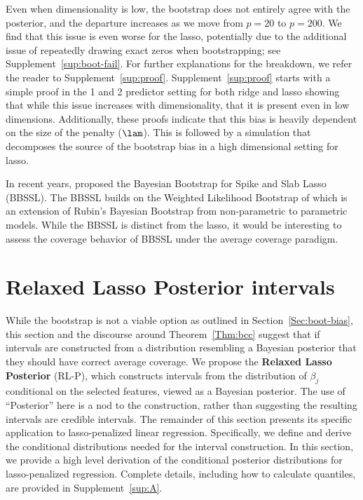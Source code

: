 Even when dimensionality is low, the bootstrap does not entirely agree with the posterior, and the departure increases as we move from $p=20$ to $p=200$. We find that this issue is even worse for the lasso, potentially due to the additional issue of repeatedly drawing exact zeros when bootstrapping; see Supplement~\ref{sup:boot-fail}. For further explanations for the breakdown, we refer the reader to Supplement~\ref{sup:proof}. Supplement~\ref{sup:proof} starts with a simple proof in the 1 and 2 predictor setting for both ridge and lasso showing that while this issue increases with dimensionality, that it is present even in low dimensions. Additionally, these proofs indicate that this bias is heavily dependent on the size of the penalty ($\lam$). This is followed by a simulation that decomposes the source of the bootstrap bias in a high dimensional setting for lasso.

In recent years, \cite{Nie2022} proposed the Bayesian Bootstrap for Spike and Slab Lasso (BBSSL). The BBSSL builds on the Weighted Likelihood Bootstrap of \cite{Newton1994} which is an extension of Rubin's Bayesian Bootstrap from non-parametric to parametric models. While the BBSSL is distinct from the lasso, it would be interesting to assess the coverage behavior of BBSSL under the average coverage paradigm.

\section{Relaxed Lasso Posterior intervals}\label{Sec:methods}

While the bootstrap is not a viable option as outlined in Section~\ref{Sec:boot-bias}, this section and the discourse around Theorem~\ref{Thm:bcc} suggest that if intervals are constructed from a distribution resembling a Bayesian posterior that they should have correct average coverage. We propose the \textbf{Relaxed Lasso Posterior} (RL-P), which constructs intervals from the distribution of $\beta_j$ conditional on the selected features, viewed as a Bayesian posterior. The use of ``Posterior'' here is a nod to the construction, rather than suggesting the resulting intervals are credible intervals. The remainder of this section presents its specific application to lasso-penalized linear regression. Specifically, we define and derive the conditional distributions needed for the interval construction. In this section, we provide a high level derivation of the conditional posterior distributions for lasso-penalized regression. Complete details, including how to calculate quantiles, are provided in Supplement~\ref{sup:A}.

